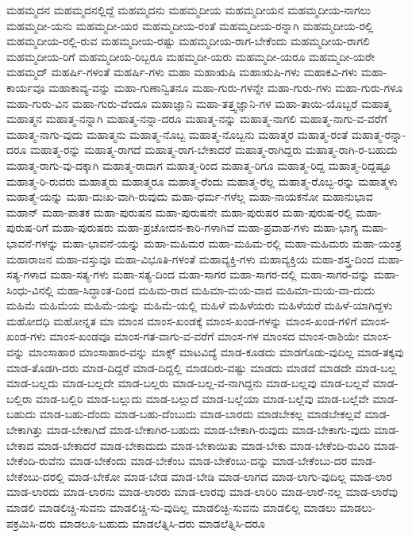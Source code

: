 {ಮಹಮ್ಮದನ
ಮಹಮ್ಮದನಲ್ಲಿದ್ದೆ
ಮಹಮ್ಮದನು
ಮಹಮ್ಮದೀಯ
ಮಹಮ್ಮದೀಯನ
ಮಹಮ್ಮದೀಯ-ನಾಗಲು
ಮಹಮ್ಮದೀ-ಯನು
ಮಹಮ್ಮದೀ-ಯರ
ಮಹಮ್ಮದೀಯ-ರಂತೆ
ಮಹಮ್ಮದೀಯ-ರನ್ನಾಗಿ
ಮಹಮ್ಮದೀಯ-ರಲ್ಲಿ
ಮಹಮ್ಮದೀಯ-ರಲ್ಲಿ-ರುವ
ಮಹಮ್ಮದೀಯ-ರಷ್ಟು
ಮಹಮ್ಮದೀಯ-ರಾಗ-ಬೇಕೆಂದು
ಮಹಮ್ಮದೀಯ-ರಾಗಲಿ
ಮಹಮ್ಮದೀಯ-ರಿಗೆ
ಮಹಮ್ಮದೀಯ-ರಿಬ್ಬರೂ
ಮಹಮ್ಮದೀ-ಯರು
ಮಹಮ್ಮದೀ-ಯರೂ
ಮಹಮ್ಮದೀ-ಯರೇ
ಮಹಮ್ಮದ್
ಮಹರ್ಷಿ-ಗಳಂತೆ
ಮಹರ್ಷಿ-ಗಳು
ಮಹಾ
ಮಹಾಋಷಿ
ಮಹಾಋಷಿ-ಗಳು
ಮಹಾಕವಿ-ಗಳು
ಮಹಾ-ಕಾರ್ಯವೂ
ಮಹಾಕಾವ್ಯ-ವನ್ನು
ಮಹಾ-ಗುಣಾನ್ವಿತನೂ
ಮಹಾ-ಗುರು-ಗಳನ್ನೇ
ಮಹಾ-ಗುರು-ಗಳು
ಮಹಾ-ಗುರು-ಗಳೂ
ಮಹಾ-ಗುರು-ವಿನ
ಮಹಾ-ಗುರು-ವೆಂದೂ
ಮಹಾಜ್ಞಾನಿ
ಮಹಾ-ತತ್ತ್ವಜ್ಞಾನಿ-ಗಳ
ಮಹಾ-ತಾಯಿ-ಯೊಬ್ಬರೆ
ಮಹಾತ್ಮ
ಮಹಾತ್ಮನ
ಮಹಾತ್ಮ-ನನ್ನಾಗಿ
ಮಹಾತ್ಮ-ನನ್ನಾ-ದರೂ
ಮಹಾತ್ಮ-ನನ್ನು
ಮಹಾತ್ಮ-ನಾಗಲಿ
ಮಹಾತ್ಮ-ನಾಗು-ವ-ವರೆಗೆ
ಮಹಾತ್ಮ-ನಾಗು-ವುದು
ಮಹಾತ್ಮನು
ಮಹಾತ್ಮ-ನೊಬ್ಬ
ಮಹಾತ್ಮ-ನೊಬ್ಬನು
ಮಹಾತ್ಮರ
ಮಹಾತ್ಮ-ರಂತೆ
ಮಹಾತ್ಮ-ರನ್ನಾ-ದರೂ
ಮಹಾತ್ಮ-ರನ್ನು
ಮಹಾತ್ಮ-ರಾಗದೆ
ಮಹಾತ್ಮ-ರಾಗ-ಬೇಕಾದರೆ
ಮಹಾತ್ಮ-ರಾಗಿದ್ದರು
ಮಹಾತ್ಮ-ರಾಗಿ-ರ-ಬಹುದು
ಮಹಾತ್ಮ-ರಾಗು-ವು-ದಕ್ಕಾಗಿ
ಮಹಾತ್ಮ-ರಾದಾಗ
ಮಹಾತ್ಮ-ರಿಂದ
ಮಹಾತ್ಮ-ರಿಗೂ
ಮಹಾತ್ಮ-ರಿದ್ದ
ಮಹಾತ್ಮ-ರಿದ್ದಷ್ಟೂ
ಮಹಾತ್ಮ-ರಿ-ರುವರು
ಮಹಾತ್ಮರು
ಮಹಾತ್ಮರೂ
ಮಹಾತ್ಮ-ರೆಂದು
ಮಹಾತ್ಮ-ರೆಲ್ಲ
ಮಹಾತ್ಮ-ರೊಬ್ಬ-ರನ್ನು
ಮಹಾತ್ಮಳು
ಮಹಾತ್ಮೆ-ಯನ್ನು
ಮಹಾ-ದುಃಖ-ವಾಗಿ-ರುವುದು
ಮಹಾ-ಧರ್ಮ-ಗಳೆಲ್ಲ
ಮಹಾ-ನಾಯಕನೋ
ಮಹಾನುಭಾವ
ಮಹಾನ್
ಮಹಾ-ಪಾತಕ
ಮಹಾ-ಪುರುಷನ
ಮಹಾ-ಪುರುಷನೇ
ಮಹಾ-ಪುರುಷರ
ಮಹಾ-ಪುರುಷ-ರಲ್ಲಿ
ಮಹಾ-ಪುರುಷ-ರಿಗೆ
ಮಹಾ-ಪುರುಷರು
ಮಹಾ-ಪ್ರಚೋದನ-ಕಾರಿ-ಗಳಾಗಿವೆ
ಮಹಾ-ಪ್ರವಾಹ-ಗಳು
ಮಹಾ-ಭಾಗ್ಯ
ಮಹಾ-ಭಾವನೆ-ಗಳನ್ನು
ಮಹಾ-ಭಾವನೆ-ಯನ್ನು
ಮಹಾ-ಮಹಿಮರ
ಮಹಾ-ಮಹಿಮ-ರಲ್ಲಿ
ಮಹಾ-ಮಹಿಮರು
ಮಹಾ-ಯಂತ್ರ
ಮಹಾರಾಜನ
ಮಹಾ-ವಸ್ತುವೂ
ಮಹಾ-ವಿಭೂತಿ-ಗಳಂತೆ
ಮಹಾವ್ಯಕ್ತಿ-ಗಳು
ಮಹಾವ್ಯಕ್ತಿಯ
ಮಹಾ-ಶಸ್ತ್ರ-ದಿಂದ
ಮಹಾ-ಸತ್ಯ-ಗಳಾದ
ಮಹಾ-ಸತ್ಯ-ಗಳು
ಮಹಾ-ಸತ್ಯ-ದಿಂದ
ಮಹಾ-ಸಾಗರ
ಮಹಾ-ಸಾಗರ-ದಲ್ಲಿ
ಮಹಾ-ಸಾಗರ-ವನ್ನು
ಮಹಾ-ಸಿಂಧು-ವಿನಲ್ಲಿ
ಮಹಾ-ಸಿದ್ಧಾಂತ-ದಿಂದ
ಮಹಿಮ-ರಾದ
ಮಹಿಮಾ-ಮಯ-ವಾದ
ಮಹಿಮಾ-ಮಯ-ವಾ-ದುದು
ಮಹಿಮೆ
ಮಹಿಮೆಯ
ಮಹಿಮೆ-ಯನ್ನು
ಮಹಿಮೆ-ಯಲ್ಲಿ
ಮಹಿಳೆ
ಮಹಿಳೆಯರು
ಮಹಿಳೆಯರೆ
ಮಹಿಳೆ-ಯಾಗಿದ್ದಳು
ಮಹೋದಧಿ
ಮಹೋನ್ನತ
ಮಾ
ಮಾಂಸ
ಮಾಂಸ-ಖಂಡಕ್ಕೆ
ಮಾಂಸ-ಖಂಡ-ಗಳನ್ನು
ಮಾಂಸ-ಖಂಡ-ಗಳಿಗೆ
ಮಾಂಸ-ಖಂಡ-ಗಳು
ಮಾಂಸ-ಖಂಡವೂ
ಮಾಂಸ-ಗತ-ವಾಗು-ವ-ವರೆಗೆ
ಮಾಂಸ-ಗಳ
ಮಾಂಸದ
ಮಾಂಸ-ರಾಶಿಯೇ
ಮಾಂಸ-ವನ್ನು
ಮಾಂಸಾಹಾರ
ಮಾಂಸಾಹಾರ-ವನ್ನು
ಮಾಕ್ಸ್
ಮಾಟವಿದ್ಯೆ
ಮಾಡ-ಕೂಡದು
ಮಾಡಗೊಡು-ವುದಿಲ್ಲ
ಮಾಡ-ತಕ್ಕವು
ಮಾಡ-ತೊಡಗಿ-ದರು
ಮಾಡ-ದಿದ್ದರೆ
ಮಾಡ-ದಿದ್ದಲ್ಲಿ
ಮಾಡದಿರು-ವಷ್ಟು
ಮಾಡದು
ಮಾಡದೆ
ಮಾಡದೇ
ಮಾಡ-ಬಲ್ಲ
ಮಾಡ-ಬಲ್ಲದು
ಮಾಡ-ಬಲ್ಲದೇ
ಮಾಡ-ಬಲ್ಲರು
ಮಾಡ-ಬಲ್ಲ-ವ-ನಾಗಿದ್ದನು
ಮಾಡ-ಬಲ್ಲವು
ಮಾಡ-ಬಲ್ಲವೆ
ಮಾಡ-ಬಲ್ಲಿರಾ
ಮಾಡ-ಬಲ್ಲಿರಿ
ಮಾಡ-ಬಲ್ಲುದು
ಮಾಡ-ಬಲ್ಲುದೆ
ಮಾಡ-ಬಲ್ಲೆಯಾ
ಮಾಡ-ಬಲ್ಲೆವು
ಮಾಡ-ಬಲ್ಲೆವೇ
ಮಾಡ-ಬಹುದು
ಮಾಡ-ಬಹು-ದೆಂದು
ಮಾಡ-ಬಹು-ದೆಂಬುದು
ಮಾಡ-ಬಾರದು
ಮಾಡಬೇಕಲ್ಲ
ಮಾಡಬೇಕಲ್ಲವೆ
ಮಾಡ-ಬೇಕಾಗಿತ್ತು
ಮಾಡ-ಬೇಕಾಗಿದೆ
ಮಾಡ-ಬೇಕಾಗಿರ-ಬಹುದು
ಮಾಡ-ಬೇಕಾಗಿ-ರುವುದು
ಮಾಡ-ಬೇಕಾಗು-ವುದು
ಮಾಡ-ಬೇಕಾದ
ಮಾಡ-ಬೇಕಾದರೆ
ಮಾಡ-ಬೇಕಾದುದು
ಮಾಡ-ಬೇಕಾಯಿತು
ಮಾಡ-ಬೇಕು
ಮಾಡ-ಬೇಕೆಂದಿ-ರುವಿರಿ
ಮಾಡ-ಬೇಕೆಂದಿ-ರುವೆನು
ಮಾಡ-ಬೇಕೆಂದು
ಮಾಡ-ಬೇಕೆಂಬ
ಮಾಡ-ಬೇಕೆಂಬು-ದನ್ನು
ಮಾಡ-ಬೇಕೆಂಬು-ದರ
ಮಾಡ-ಬೇಕೆಂಬು-ದರಲ್ಲಿ
ಮಾಡ-ಬೇಕೋ
ಮಾಡ-ಬೇಡ
ಮಾಡ-ಬೇಡಿ
ಮಾಡ-ಲಾಗದ
ಮಾಡ-ಲಾಗು-ವುದಿಲ್ಲ
ಮಾಡ-ಲಾರ
ಮಾಡ-ಲಾರದು
ಮಾಡ-ಲಾರನು
ಮಾಡ-ಲಾರರು
ಮಾಡ-ಲಾರವು
ಮಾಡ-ಲಾರಿರಿ
ಮಾಡ-ಲಾರೆ-ನಲ್ಲ
ಮಾಡ-ಲಾರೆವು
ಮಾಡಲಿ
ಮಾಡಲಿಚ್ಚಿ-ಸುವನು
ಮಾಡಲಿಚ್ಚಿ-ಸು-ವುದಿಲ್ಲ
ಮಾಡಲಿಚ್ಛಿ-ಸುವನು
ಮಾಡಲಿಲ್ಲ
ಮಾಡಲು
ಮಾಡಲು-ಪಕ್ರಮಿಸಿ-ದರು
ಮಾಡಲೂ-ಬಹುದು
ಮಾಡಲೆತ್ನಿಸಿ-ದರು
ಮಾಡಲೆತ್ನಿಸಿ-ದರೂ
}
